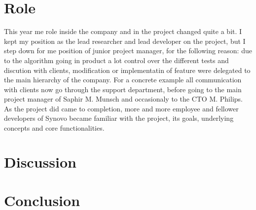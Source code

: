 \documentclass[12pt]{memoir}
\begin{document}
\section{Role}

This year me role inside the company and in the project changed quite a bit. I kept
my position as the lead researcher and lead developer on the project, but I step
down for me position of junior project manager, for the following reason: due to the
algorithm going in product a lot control over the different tests and discution with
clients, modification or implementatin of feature were delegated to the main
hierarchy of the company. For a concrete example all communication with clients now
go through the support department, before going to the main project manager of
Saphir M. Munsch and occasionaly to the CTO M. Philips.\\
As the project did came to completion, more and more employee and fellower
developers of Synovo became familiar with the project, its goals, underlying
concepts and core functionalities.

\section{Discussion}

\section{Conclusion}

\nocite{*}


\end{document}
